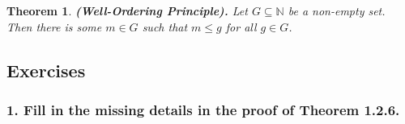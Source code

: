 \documentclass{article}
\newtheorem{theorem}{Theorem}
\newcommand{\N}{\mathbb{N}}
\begin{document}
\begin{theorem}
	\textbf{(Well-Ordering Principle).} Let $G \subseteq \N$ be a non-empty set. Then there is some $m \in G$ such that $m \le g$ for all $g \in G$.
\end{theorem}

\subsection*{Exercises}

\subsubsection*{1. Fill in the missing details in the proof of Theorem 1.2.6.}
\end{document}
